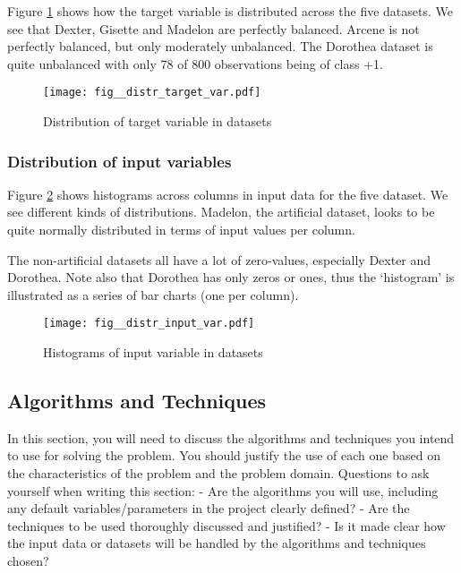 \documentclass[12pt]{article}
\begin{document}
Figure \ref{fig:distr_target_var} shows how the target variable is distributed across the five datasets. We see that Dexter, Gisette and Madelon are perfectly balanced. Arcene is not perfectly balanced, but only moderately unbalanced. The Dorothea dataset is quite unbalanced with only 78 of 800 observations being of class +1.

\begin{figure}[h]
  \begin{center}
    \texttt{[image: fig\_\_distr\_target\_var.pdf]}
    \caption{\label{fig:distr_target_var} Distribution of target variable in datasets}
  \end{center}
\end{figure}

\subsubsection{Distribution of input variables}

Figure \ref{fig:distr_input_var} shows histograms across columns in input data for the five dataset. We see different kinds of distributions. Madelon, the artificial dataset, looks to be quite normally distributed in terms of input values per column.

The non-artificial datasets all have a lot of zero-values, especially Dexter and Dorothea. Note also that Dorothea has only zeros or ones, thus the `histogram' is illustrated as a series of bar charts (one per column).

\begin{figure}[h]
  \begin{center}
    \texttt{[image: fig\_\_distr\_input\_var.pdf]}
    \caption{\label{fig:distr_input_var} Histograms of input variable in datasets}
  \end{center}
\end{figure}

\subsection{Algorithms and Techniques}
In this section, you will need to discuss the algorithms and techniques you intend to use for solving the problem. You should justify the use of each one based on the characteristics of the problem and the problem domain. Questions to ask yourself when writing this section:
- Are the algorithms you will use, including any default variables/parameters in the project clearly defined?
- Are the techniques to be used thoroughly discussed and justified?
- Is it made clear how the input data or datasets will be handled by the algorithms and techniques chosen?
\end{document}
